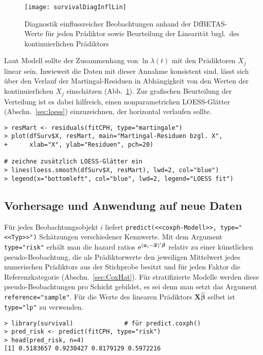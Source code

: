 \begin{figure}[ht]
\centering
\texttt{[image: survivalDiagInflLin]}
\vspace*{-0.5em}
\caption{Diagnostik einflussreicher Beobachtungen anhand der DfBETAS-Werte für jeden Prädiktor sowie Beurteilung der Linearität bzgl.\ des kontinuierlichen Prädiktors}
\label{fig:survivalDiagInflLin}
\end{figure}

Laut Modell sollte der Zusammenhang von $\ln \lambda(t)$ mit den Prädiktoren $X_{j}$ linear sein. Inwieweit die Daten mit dieser Annahme konsistent sind, lässt sich über den Verlauf der Martingal-Residuen in Abhängigkeit von den Werten der kontinuierlichen $X_{j}$ einschätzen (Abb.\ \ref{fig:survivalDiagInflLin}). Zur grafischen Beurteilung der Verteilung ist es dabei hilfreich, einen nonparametrichen LOESS-Glätter (Abschn.\ \ref{sec:loess}) einzuzeichnen, der horizontal verlaufen sollte.
\begin{lstlisting}
> resMart <- residuals(fitCPH, type="martingale")
> plot(dfSurv$X, resMart, main="Martingal-Residuen bzgl. X",
+      xlab="X", ylab="Residuen", pch=20)

# zeichne zusätzlich LOESS-Glätter ein
> lines(loess.smooth(dfSurv$X, resMart), lwd=2, col="blue")
> legend(x="bottomleft", col="blue", lwd=2, legend="LOESS fit")
\end{lstlisting}

\subsection{Vorhersage und Anwendung auf neue Daten}
\label{sec:survPredict}

Für jedes Beobachtungsobjekt $i$ liefert \lstinline!predict(<<coxph-Modell>>, type="<<Typ>>")! Schätzungen verschiedener Kennwerte. Mit dem Argument \lstinline!type="risk"! erhält man die hazard ratios ${\mathrm{e}}^{(\bm{x}_{i} - \overline{\bm{x}})' \hat{\bm{\beta}}}$ relativ zu einer künstlichen pseudo-Beobachtung, die als Prädiktorwerte den jeweiligen Mittelwert jedes numerischen Prädiktors aus der Stichprobe besitzt und für jeden Faktor die Referenzkategorie (Abschn.\ \ref{sec:CoxHat}). Für stratifizierte Modelle werden diese pseudo-Beobachtungen pro Schicht gebildet, es sei denn man setzt das Argument \lstinline!reference="sample"!. Für die Werte des linearen Prädiktors $\bm{X} \hat{\bm{\beta}}$ selbst ist \lstinline!type="lp"! zu verwenden.
\begin{lstlisting}
> library(survival)              # für predict.coxph()
> pred_risk <- predict(fitCPH, type="risk")
> head(pred_risk, n=4)
[1] 0.5183657 0.9230427 0.8179129 0.5972216
\end{lstlisting}

